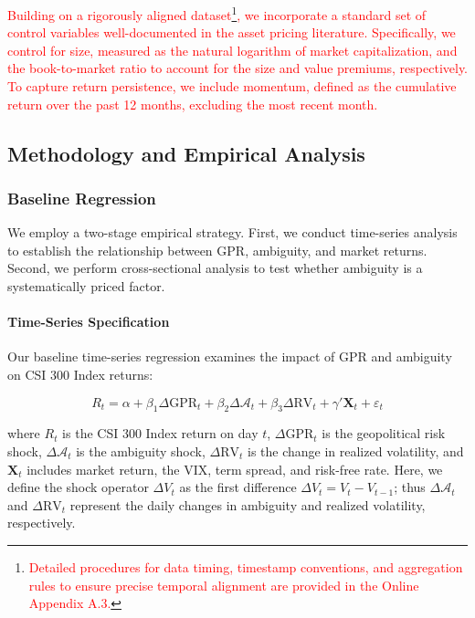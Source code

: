 \documentclass[preprint,12pt,authoryear]{elsarticle}
\begin{document}
\textcolor{red}{Building on a rigorously aligned dataset\footnote{\textcolor{red}{Detailed procedures for data timing, timestamp conventions, and aggregation rules to ensure precise temporal alignment are provided in the Online Appendix A.3.}}, we incorporate a standard set of control variables well-documented in the asset pricing literature. Specifically, we control for size, measured as the natural logarithm of market capitalization, and the book-to-market ratio to account for the size and value premiums, respectively. To capture return persistence, we include momentum, defined as the cumulative return over the past 12 months, excluding the most recent month.}

\subsection{Methodology and Empirical Analysis}

\subsubsection{Baseline Regression}

We employ a two-stage empirical strategy. First, we conduct time-series analysis to establish the relationship between GPR, ambiguity, and market returns. Second, we perform cross-sectional analysis to test whether ambiguity is a systematically priced factor.

\paragraph{Time-Series Specification}
Our baseline time-series regression examines the impact of GPR and ambiguity on CSI 300 Index returns:

\begin{equation}
R_{t} = \alpha + \beta_1 \Delta \text{GPR}_{t} + \beta_2 \Delta \mathcal{A}_{t} + \beta_3 \Delta \text{RV}_{t} + \gamma' \mathbf{X}_{t} + \varepsilon_{t}
\end{equation}

where $R_t$ is the CSI 300 Index return on day $t$, $\Delta \text{GPR}_t$ is the geopolitical risk shock, $\Delta \mathcal{A}_t$ is the ambiguity shock, $\Delta \text{RV}_t$ is the change in realized volatility, and $\mathbf{X}_t$ includes market return, the VIX, term spread, and risk-free rate. Here, we define the shock operator $\Delta V_t$ as the first difference $\Delta V_t = V_t - V_{t-1}$; thus $\Delta \mathcal{A}_t$ and $\Delta \text{RV}_t$ represent the daily changes in ambiguity and realized volatility, respectively.
\end{document}
